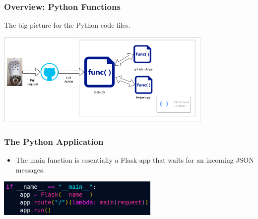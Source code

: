 \documentclass[aspectratio=169]{beamer}
\begin{document}
\begin{frame}
	\frametitle{Overview: Python Functions}
	The big picture for the Python code files.
	\vspace{2mm}

	\includegraphics[width=0.785\textwidth]{../images/arch_diagrams-python-big-block.png}
\end{frame}

\begin{frame}
	\frametitle{The Python Application}

	\begin{itemize}
		\item The main function is essentially a Flask app that waits for an incoming JSON messages.
	\end{itemize}
	\begin{center}
		\includegraphics[width=0.585\textwidth]{../images/main-function-py.png}
	\end{center}

\end{frame}
\end{document}
